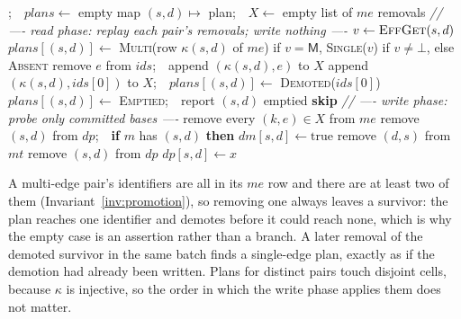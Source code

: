 \documentclass[11pt,a4paper]{article}
\theoremstyle{plain}
\theoremstyle{definition}
\theoremstyle{remark}
\newcommand{\M}{\mathsf{M}}
\begin{document}
\begin{algorithm}[H]
\small
\caption{\textsc{RemoveAll}, slow path}
\label{alg:remove}
\begin{algorithmic}[1]
\State {};\ \ $\mathit{plans} \gets$ empty map $(s,d) \mapsto$ plan;\ \ $X \gets$ empty list of $me$ removals
\Statex \textit{// ---- read phase: replay each pair's removals; write nothing ----}
    \State $v \gets \Call{EffGet}{s,d}$
    \State $\mathit{plans}[(s,d)] \gets$ \textsc{Multi}(row $\kappa(s,d)$ of $me$) if $v = \M$, \textsc{Single}($v$) if $v \neq \bot$, else \textsc{Absent}
  \EndIf
      \State remove $e$ from $\mathit{ids}$;\ \ append $(\kappa(s,d), e)$ to $X$
       
        \State append $(\kappa(s,d), \mathit{ids}[0])$ to $X$;\ \ $\mathit{plans}[(s,d)] \gets$ \textsc{Demoted}($\mathit{ids}[0]$)
      \EndIf
    \EndCase
     
      \State $\mathit{plans}[(s,d)] \gets$ \textsc{Emptied};\ \ report $(s,d)$ emptied
    \EndCase
     
      \State \textbf{skip}
    \EndCase
  \EndSwitch
\EndFor
\Statex \textit{// ---- write phase: probe only committed bases ----}
\State remove every $(k, e) \in X$ from $me$
    \State remove $(s,d)$ from $dp$;\ \ \textbf{if} $m$ has $(s,d)$ \textbf{then} $dm[s,d] \gets \mathrm{true}$
    \State remove $(d,s)$ from $mt$
     \State remove $(s,d)$ from $dp$ 
    \Else \State $dp[s,d] \gets x$ 
    \EndIf
  \EndIf
\EndFor
\end{algorithmic}
\end{algorithm}

A multi-edge pair's identifiers are all in its $me$ row and there are at least
two of them (Invariant~\ref{inv:promotion}), so removing one always leaves a
survivor: the plan reaches one identifier and demotes before it could reach
none, which is why the empty case is an assertion rather than a branch. A
later removal of the demoted survivor in the same batch finds a single-edge
plan, exactly as if the demotion had already been written. Plans for distinct
pairs touch disjoint cells, because $\kappa$ is injective, so the order in which
the write phase applies them does not matter.
\end{document}
